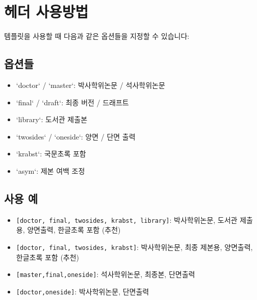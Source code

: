 \section{헤더 사용방법}
템플릿을 사용할 때 다음과 같은 옵션들을 지정할 수 있습니다:

\subsection{옵션들}
\begin{itemize}
  \item `doctor` / `master`: 박사학위논문 / 석사학위논문
  \item `final` / `draft`: 최종 버전 / 드래프트
  \item `library`: 도서관 제출본
  \item `twosides` / `oneside`: 양면 / 단면 출력
  \item `krabst`: 국문초록 포함
  \item `asym`: 제본 여백 조정
\end{itemize}


\subsection{사용 예}

\begin{itemize}
    \item \verb|[doctor, final, twosides, krabst, library]|: 박사학위논문, 도서관 제출용, 양면출력, 한글초록 포함 (추천)
    \item \verb|[doctor, final, twosides, krabst]|: 박사학위논문, 최종 제본용, 양면출력, 한글초록 포함 (추천)
    \item \verb|[master,final,oneside]|: 석사학위논문, 최종본, 단면출력
    \item \verb|[doctor,oneside]|: 박사학위논문, 단면출력
\end{itemize}



